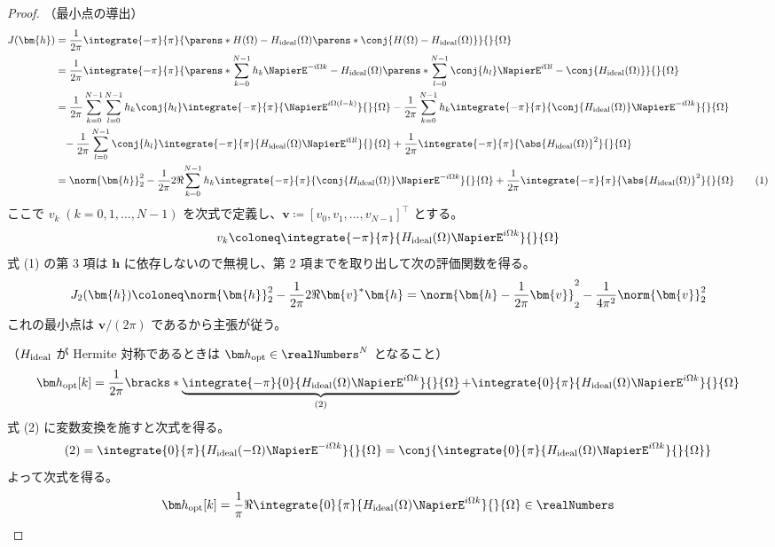         \begin{proof}
            \quad\par\noindent
            （最小点の導出）
            \begin{align*}
                J(\bm{h}) &= \frac{1}{2\pi}\integrate{-\pi}{\pi}{\parens*{H(\Omega)-\Hideal(\Omega)}\parens*{\conj{H(\Omega)-\Hideal(\Omega)}}}{}{\Omega} \\
                &= \frac{1}{2\pi}\integrate{-\pi}{\pi}{\parens*{\sum_{k=0}^{N-1} h_k\NapierE^{-i\Omega k} -\Hideal(\Omega)}\parens*{\sum_{l=0}^{N-1} \conj{h_l}\NapierE^{i\Omega l} -\conj{\Hideal(\Omega)}}}{}{\Omega} \\
                &= \frac{1}{2\pi}\sum_{k=0}^{N-1}\sum_{l=0}^{N-1} h_k\conj{h_l}\integrate{-\pi}{\pi}{\NapierE^{i\Omega(l-k)}}{}{\Omega} - \frac{1}{2\pi}\sum_{k=0}^{N-1} h_k\integrate{-\pi}{\pi}{\conj{\Hideal(\Omega)}\NapierE^{-i\Omega k}}{}{\Omega} \\
                &\phantom{=}- \frac{1}{2\pi}\sum_{l=0}^{N-1} \conj{h_l}\integrate{-\pi}{\pi}{\Hideal(\Omega)\NapierE^{i\Omega l}}{}{\Omega} + \frac{1}{2\pi}\integrate{-\pi}{\pi}{\abs{\Hideal(\Omega)}^2}{}{\Omega} \\
                &= \norm{\bm{h}}_2^2 - \frac{1}{2\pi}2\Re{\sum_{k=0}^{N-1} h_k\integrate{-\pi}{\pi}{\conj{\Hideal(\Omega)}\NapierE^{-i\Omega k}}{}{\Omega}} + \frac{1}{2\pi}\integrate{-\pi}{\pi}{\abs{\Hideal(\Omega)}^2}{}{\Omega} \tag{1}
            \end{align*}
            ここで $v_k\;(k=0,1,\dots,N-1)$ を次式で定義し、$\bm{v}\coloneq[v_0,v_1,\dots,v_{N-1}]^\top$ とする。
            \[ v_k \coloneq \integrate{-\pi}{\pi}{\Hideal(\Omega)\NapierE^{i\Omega k}}{}{\Omega} \]
            式 (1) の第 3 項は $\bm{h}$ に依存しないので無視し、第 2 項までを取り出して次の評価関数を得る。
            \[ J_2(\bm{h}) \coloneq \norm{\bm{h}}_2^2 - \frac{1}{2\pi}2\Re{\bm{v}^*\bm{h}} = \norm{\bm{h} - \frac{1}{2\pi}\bm{v}}_2^2 - \frac{1}{4\pi^2}\norm{\bm{v}}_2^2 \]
            これの最小点は $\bm{v}/(2\pi)$ であるから主張が従う。
            \newline
            \par\noindent
            （$H_\text{ideal}$ が Hermite 対称であるときは $\vhOpt\in\realNumbers^N$ となること）
            \[ \vhOpt[k] = \frac{1}{2\pi}\bracks*{\underbrace{\integrate{-\pi}{0}{\Hideal(\Omega)\NapierE^{i\Omega k}}{}{\Omega}}_{(2)} + \integrate{0}{\pi}{\Hideal(\Omega)\NapierE^{i\Omega k}}{}{\Omega}} \]
            式 (2) に変数変換を施すと次式を得る。
            \[ (2) = \integrate{0}{\pi}{\Hideal(-\Omega)\NapierE^{-i\Omega k}}{}{\Omega} = \conj{\integrate{0}{\pi}{\Hideal(\Omega)\NapierE^{i\Omega k}}{}{\Omega}} \]
            よって次式を得る。
            \[ \vhOpt[k] = \frac{1}{\pi}\Re{\integrate{0}{\pi}{\Hideal(\Omega)\NapierE^{i\Omega k}}{}{\Omega}}\in\realNumbers \]
        \end{proof}
